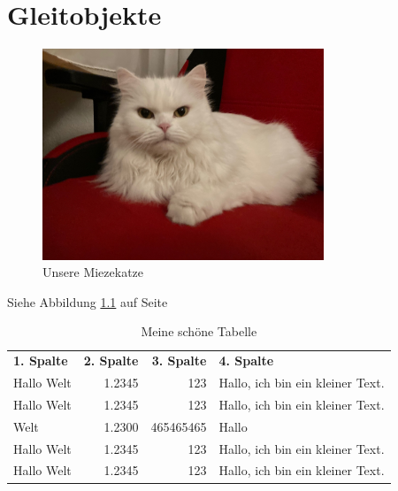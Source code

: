 \documentclass[12pt,ngerman,parskip=half]{scrreprt} %
\begin{document}
\chapter{Gleitobjekte}

\blindtext

\blindtext


\begin{figure}[h] %
\begin{center}
\includegraphics[width=0.75\textwidth]{./Bilder/Katze/Katze2.jpg}
\caption{Unsere Miezekatze}\label{fig:katze}
\end{center}
\end{figure}

Siehe Abbildung \ref{fig:katze}  auf Seite \pageref{fig:katze}

\blindtext

\blindtext

\blindtext

\begin{table}
\begin{center}
\caption{Meine schöne Tabelle}\label{tab:nice}
\begin{tabular}{lrrp{60mm}} \toprule[2pt]
\textbf{1. Spalte} & \textbf{2. Spalte} & \textbf{3. Spalte} & \textbf{4. Spalte} \\ \cmidrule[1pt](rl){1-4}
Hallo Welt & 1.2345 & 123 & Hallo, ich bin ein kleiner Text. \\ 
Hallo Welt & 1.2345 & 123 & Hallo, ich bin ein kleiner Text. \\ 
Welt & 1.2300 & 465465465 & Hallo \\ 
Hallo Welt & 1.2345 & 123 & Hallo, ich bin ein kleiner Text. \\ 
Hallo Welt & 1.2345 & 123 & Hallo, ich bin ein kleiner Text. \\ \bottomrule
\end{tabular}
\end{center}
\end{table}

\blindtext

\blindtext
\end{document}
